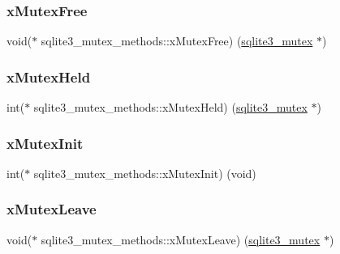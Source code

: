 \subsubsection{\texorpdfstring{xMutexFree}{xMutexFree}}
{\footnotesize\ttfamily void($\ast$ sqlite3\+\_\+mutex\+\_\+methods\+::x\+Mutex\+Free) (\mbox{\hyperlink{sqlite3_8h_a0f546860bde03fddb33a9fed920da05c}{sqlite3\+\_\+mutex}} $\ast$)}

\mbox{\label{structsqlite3__mutex__methods_a71a26118133388426ddf18ab59ce87f5}} 
\subsubsection{\texorpdfstring{xMutexHeld}{xMutexHeld}}
{\footnotesize\ttfamily int($\ast$ sqlite3\+\_\+mutex\+\_\+methods\+::x\+Mutex\+Held) (\mbox{\hyperlink{sqlite3_8h_a0f546860bde03fddb33a9fed920da05c}{sqlite3\+\_\+mutex}} $\ast$)}

\mbox{\label{structsqlite3__mutex__methods_a1a163f0e0eaed85223b1537434df635a}} 
\subsubsection{\texorpdfstring{xMutexInit}{xMutexInit}}
{\footnotesize\ttfamily int($\ast$ sqlite3\+\_\+mutex\+\_\+methods\+::x\+Mutex\+Init) (void)}

\mbox{\label{structsqlite3__mutex__methods_a0d4ef78481d18de5f9346f80321a17b1}} 
\subsubsection{\texorpdfstring{xMutexLeave}{xMutexLeave}}
{\footnotesize\ttfamily void($\ast$ sqlite3\+\_\+mutex\+\_\+methods\+::x\+Mutex\+Leave) (\mbox{\hyperlink{sqlite3_8h_a0f546860bde03fddb33a9fed920da05c}{sqlite3\+\_\+mutex}} $\ast$)}

